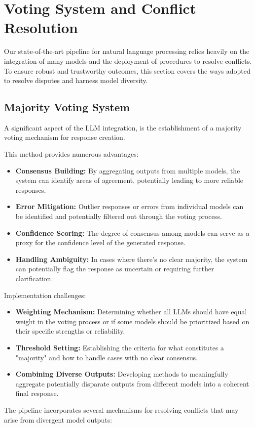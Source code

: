 \section{Voting System and Conflict Resolution}\label{sec:model-diversity-and-conflict-resolution}
Our state-of-the-art pipeline for natural language processing relies heavily on the integration of many models and the deployment of procedures to resolve conflicts.
To ensure robust and trustworthy outcomes, this section covers the ways adopted to resolve disputes and harness model diversity.

\subsection{Majority Voting System}\label{subsec:majority-voting-system}
A significant aspect of the LLM integration, is the establishment of a majority voting mechanism for response creation.

This method provides numerous advantages:
\begin{itemize}
    \item \textbf{Consensus Building:} By aggregating outputs from multiple models, the system can identify areas of agreement, potentially leading to more reliable responses.
    \item \textbf{Error Mitigation:} Outlier responses or errors from individual models can be identified and potentially filtered out through the voting process.
    \item \textbf{Confidence Scoring:} The degree of consensus among models can serve as a proxy for the confidence level of the generated response.
    \item \textbf{Handling Ambiguity:} In cases where there's no clear majority, the system can potentially flag the response as uncertain or requiring further clarification.
\end{itemize}

Implementation challenges:
\begin{itemize}
    \item \textbf{Weighting Mechanism:} Determining whether all LLMs should have equal weight in the voting process or if some models should be prioritized based on their specific strengths or reliability.
    \item \textbf{Threshold Setting:} Establishing the criteria for what constitutes a "majority" and how to handle cases with no clear consensus.
    \item \textbf{Combining Diverse Outputs:} Developing methods to meaningfully aggregate potentially disparate outputs from different models into a coherent final response.
\end{itemize}
The pipeline incorporates several mechanisms for resolving conflicts that may arise from divergent model outputs:

